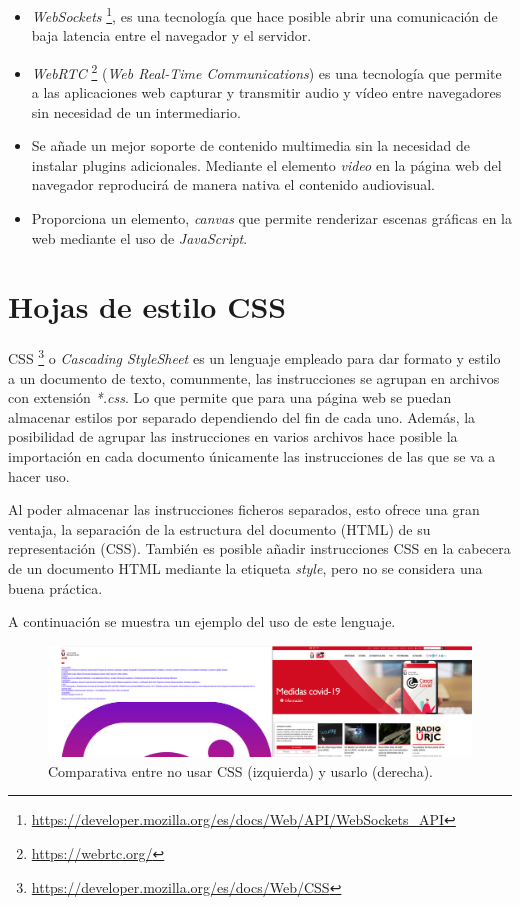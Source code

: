 \documentclass[a4paper, 12pt]{book}
\begin{document}
\begin{itemize}
\itemsep 0em
\item \textit{WebSockets} \footnote{\url{https://developer.mozilla.org/es/docs/Web/API/WebSockets_API}}, es una tecnología que hace posible abrir una comunicación de baja latencia entre el navegador y el servidor.
\item \textit{WebRTC} \footnote{\url{https://webrtc.org/}} (\textit{Web Real-Time Communications}) es una tecnología que permite a las aplicaciones web capturar y transmitir audio y vídeo entre navegadores sin necesidad de un intermediario.
\item Se añade un mejor soporte de contenido multimedia sin la necesidad de instalar plugins adicionales. Mediante el elemento \textit{video} en la página web del navegador reproducirá de manera nativa el contenido audiovisual.
\item Proporciona un elemento, \textit{canvas} que permite renderizar escenas gráficas en la web mediante el uso de \textit{JavaScript}.
\end{itemize}

\section{Hojas de estilo CSS}
\label{sec:css}

CSS \footnote{\url{https://developer.mozilla.org/es/docs/Web/CSS}} o \textit{Cascading StyleSheet} es un lenguaje empleado para dar formato y estilo a un documento de texto, comunmente, las instrucciones se agrupan en archivos con extensión \emph{*.css}. Lo que permite que para una página web se puedan almacenar estilos por separado dependiendo del fin de cada uno. Además, la posibilidad de agrupar las instrucciones en varios archivos hace posible la importación en cada documento únicamente las instrucciones de las que se va a hacer uso.

Al poder almacenar las instrucciones ficheros separados, esto ofrece una gran ventaja, la separación de la estructura del documento (HTML) de su representación (CSS). También es posible añadir instrucciones CSS en la cabecera de un documento HTML mediante la etiqueta \textit{style}, pero  no se considera una buena práctica.

A continuación se muestra un ejemplo del uso de este lenguaje.

\begin{figure}[H]
	\centering
    \includegraphics[width=15cm]{img/nocss_vs_css}
    \caption{Comparativa entre no usar CSS (izquierda) y usarlo (derecha).}
    \label{figura:nocss_vs_css}
\end{figure}
\end{document}
